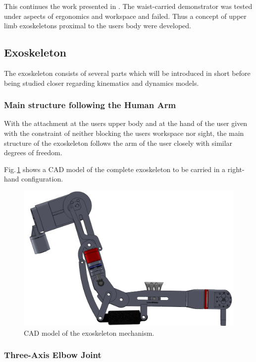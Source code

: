 \documentclass[letterpaper, 10 pt, conference]{ieeeconf}  %
\begin{document}
This continues the work presented in \cite{PetereitAlbJerSch2012}. 
The waist-carried demonstrator was tested under aspects of ergonomics and workspace and failed. Thus a concept of upper limb exoskeletons proximal to the users body were developed.

\subsection{Exoskeleton}

The exoskeleton consists of several parts which will be introduced in short before being studied closer regarding kinematics and dynamics models.

\subsubsection{Main structure following the Human Arm}

With the attachment at the users upper body and at the hand of the user given with the constraint of neither blocking the users workspace nor sight, the main structure of the exoskeleton follows the arm of the user closely with similar degrees of freedom.

Fig.\,\ref{fig:KAS5_CAD} shows a CAD model of the complete exoskeleton to be carried in a right-hand configuration.


\begin{figure}[tb!]
    \includegraphics[width=\linewidth]{figures/KAS5_Seitenansicht_CAD_Ausschnitt_transp.png}
    \caption{CAD model of the exoskeleton mechanism.}
    \label{fig:KAS5_CAD}
\end{figure} 

\subsubsection{Three-Axis Elbow Joint}
\end{document}
